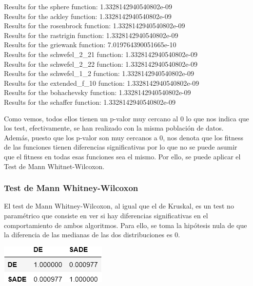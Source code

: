 \documentclass[11pt, a4paper, titlepage]{article}
\begin{document}
\vspace{5mm}

Results for the sphere function: 1.3328142940540802e-09\\
Results for the ackley function: 1.3328142940540802e-09\\
Results for the rosenbrock function: 1.3328142940540802e-09\\
Results for the rastrigin function: 1.3328142940540802e-09\\
Results for the griewank function: 7.019764390051665e-10\\
Results for the schwefel\_2\_21 function: 1.3328142940540802e-09\\
Results for the schwefel\_2\_22 function: 1.3328142940540802e-09\\
Results for the schwefel\_1\_2 function: 1.3328142940540802e-09\\
Results for the extended\_f\_10 function: 1.3328142940540802e-09\\
Results for the bohachevsky function: 1.3328142940540802e-09\\
Results for the schaffer function: 1.3328142940540802e-09\\

\vspace{5mm}

Como vemos, todos ellos tienen un p-valor muy cercano al 0 lo que nos indica que los test, efectivamente, se han realizado con la misma población de datos. Además, puesto que los p-valor son muy cercanos a 0, nos denota que los fitness de las funciones tienen diferencias significativas por lo que no se puede asumir que el fitness en todas esas funciones sea el mismo. Por ello, se puede aplicar el Test de Mann Whitnet-Wilcoxon.
\newpage
\subsubsection{Test de Mann Whitney-Wilcoxon}
\vspace{5mm}
El test de Mann Whitney-Wilcoxon, al igual que el de Kruskal, es un test no paramétrico que consiste en ver si hay diferencias significativas en el comportamiento de ambos algoritmos. Para ello, se toma la hipótesis nula de que la diferencia de las medianas de las dos distribuciones es 0.

\vspace{5mm}

\begin{center}
\includegraphics[scale=0.85]{tableWhitney.png}
\end{center}
\end{document}

